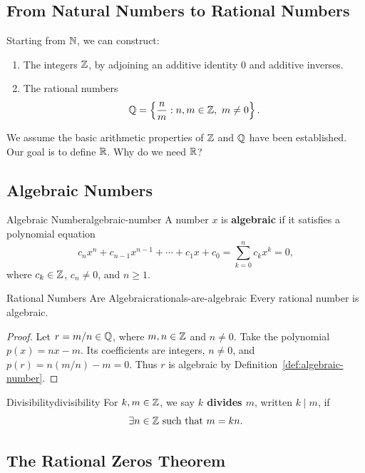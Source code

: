 \subsection{From Natural Numbers to Rational Numbers}

Starting from $\mathbb{N}$, we can construct:
\begin{enumerate}
  \item The integers $\mathbb{Z}$, by adjoining an additive identity $0$ and additive inverses.
  \item The rational numbers
        \[
          \Q=\left\{\frac{n}{m} : n,m\in\Z,\ m\ne0\right\}.
        \]
\end{enumerate}
We assume the basic arithmetic properties of $\mathbb{Z}$ and $\mathbb{Q}$ have been established.
Our goal is to define $\mathbb{R}$. Why do we need $\mathbb{R}$?

\subsection{Algebraic Numbers}

\begin{definition}{Algebraic Number}{algebraic-number}
  A number $x$ is \textbf{algebraic} if it satisfies a polynomial equation
  \[
    c_nx^n+c_{n-1}x^{n-1}+\cdots+c_1x+c_0
    =\sum_{k=0}^{n}c_kx^k=0,
  \]
  where $c_k\in\mathbb{Z}$, $c_n\ne0$, and $n\ge1$.
\end{definition}

\begin{theorem}{Rational Numbers Are Algebraic}{rationals-are-algebraic}
  Every rational number is algebraic.
\end{theorem}

\begin{proof}
  Let $r=m/n\in\mathbb{Q}$, where $m,n\in\mathbb{Z}$ and $n\ne0$.
  Take the polynomial $p(x)=nx-m$. Its coefficients are integers, $n\ne0$,
  and $p(r)=n(m/n)-m=0$. Thus $r$ is algebraic by Definition~\ref{def:algebraic-number}.
\end{proof}

\begin{definition}{Divisibility}{divisibility}
  For $k,m\in\mathbb{Z}$, we say \textbf{$k$ divides $m$}, written $k\mid m$, if
  \[
    \exists n\in\mathbb{Z}\text{ such that }m=kn.
  \]
\end{definition}

\subsection{The Rational Zeros Theorem}

